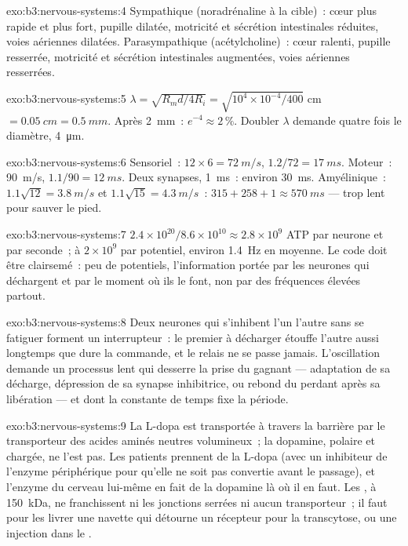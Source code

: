 \begin{solution}{exo:b3:nervous-systems:4}
Sympathique (noradrénaline à la cible)~: cœur plus rapide et plus fort,
pupille dilatée, motricité et sécrétion intestinales réduites, voies
aériennes dilatées. Parasympathique (acétylcholine)~: cœur ralenti,
pupille resserrée, motricité et sécrétion intestinales augmentées, voies
aériennes resserrées.
\end{solution}

\begin{solution}{exo:b3:nervous-systems:5}
$\lambda = \sqrt{R_{m}d/4R_{i}} = \sqrt{10^{4}\times 10^{-4}/400}$ cm
$= \qty{0.05}{cm} = \qty{0.5}{mm}$. Après \qty{2}{mm}~: $e^{-4} \approx
2\,\%$. Doubler $\lambda$ demande quatre fois le diamètre,
\qty{4}{\micro m}.
\end{solution}

\begin{solution}{exo:b3:nervous-systems:6}
Sensoriel~: $12\times 6 = \qty{72}{m/s}$, $1.2/72 = \qty{17}{ms}$.
Moteur~: \qty{90}{m/s}, $1.1/90 = \qty{12}{ms}$. Deux synapses,
\qty{1}{ms}~: environ \qty{30}{ms}. Amyélinique~:
$1.1\sqrt{12} = \qty{3.8}{m/s}$ et
$1.1\sqrt{15} = \qty{4.3}{m/s}$~: $315 + 258 + 1 \approx \qty{570}{ms}$
--- trop lent pour sauver le pied.
\end{solution}

\begin{solution}{exo:b3:nervous-systems:7}
$2.4\times 10^{20}/8.6\times 10^{10} \approx 2.8\times 10^{9}$ ATP par
neurone et par seconde~; à $2\times 10^{9}$ par potentiel, environ
\qty{1.4}{Hz} en moyenne. Le code doit être clairsemé~: peu de
potentiels, l'information portée par les neurones qui déchargent et par
le moment où ils le font, non par des fréquences élevées partout.
\end{solution}

\begin{solution}{exo:b3:nervous-systems:8}
Deux neurones qui s'inhibent l'un l'autre sans se fatiguer forment un
interrupteur~: le premier à décharger étouffe l'autre aussi longtemps
que dure la commande, et le relais ne se passe jamais. L'oscillation
demande un processus lent qui desserre la prise du gagnant ---
adaptation de sa décharge, dépression de sa synapse inhibitrice, ou
rebond du perdant après sa libération --- et dont la constante de temps
fixe la période.
\end{solution}

\begin{solution}{exo:b3:nervous-systems:9}
La L-dopa est transportée à travers la barrière par le transporteur des
acides aminés neutres volumineux~; la dopamine, polaire et chargée, ne
l'est pas. Les patients prennent de la L-dopa (avec un inhibiteur de
l'enzyme périphérique pour qu'elle ne soit pas convertie avant le
passage), et l'enzyme du cerveau lui-même en fait de la dopamine là où
il en faut. Les , à \qty{150}{kDa}, ne franchissent ni les
jonctions serrées ni aucun transporteur~; il faut pour les livrer une
navette qui détourne un récepteur pour la transcytose, ou une injection
dans le .
\end{solution}

